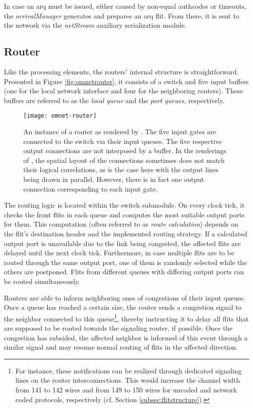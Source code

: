 In case an \gls{arq} must be issued, either caused by non-equal authcodes or timeouts, the \textit{arrivalManager} generates and prepares an
\gls{arq} flit. From there, it is sent to the network via the \textit{netStream} auxiliary serialization module.

\subsection{Router}\label{subsec:routerimpl}
Like the processing elements, the routers' internal structure is straightforward. Presented in Figure \vref{fig:omnetrouter}, it consists of a switch
and five input buffers (one for the local network interface and four for the neighboring routers). These buffers are referred to as the \textit{local
queue} and the \textit{port queues}, respectively.

\begin{figure}
    \centering
    \texttt{[image: omnet-router]}
    \caption[Simulator view of the router]{An instance of a router as rendered by \omnet{}. The five input gates are connected to the switch via their
    input queues. The five respective output connections are not interposed by a buffer. In the renderings of \omnet{}, the spatial layout of the
    connections sometimes does not match their logical correlations, as is the case here with the output lines being drawn in parallel. However, there is
    in fact one output connection corresponding to each input gate.}
    \label{fig:omnetrouter}
\end{figure}

The routing logic is located within the switch submodule. On every clock tick, it checks the front flits in each queue and computes the most suitable
output ports for them. This computation (often referred to as \textit{route calculation}) depends on the flit's destination header and the implemented routing
strategy. If a calculated output port is unavailable due to the link being congested, the affected flits are delayed until the next clock tick.
Furthermore, in case multiple flits are to be routed through the same output port, one of them is randomly selected while the others are postponed.
Flits from different queues with differing output ports can be routed simultaneously.

Routers are able to inform neighboring ones of congestions of their input queues. Once a queue has reached a certain size, the router sends a congestion signal to the
neighbor connected to this queue\footnote{For instance, these notifications can be realized through dedicated signaling lines on the router
interconnections. This would increase the channel width from 141 to 142 wires and from 149 to 150 wires for uncoded and network coded protocols,
respectively (cf. Section \ref{subsec:flitstructure}).}, thereby instructing it to delay all flits that are supposed to be routed towards the
signaling router, if possible. Once the congestion has subsided, the affected neighbor is informed of this event through a similar signal and may
resume normal routing of flits in the affected direction.

